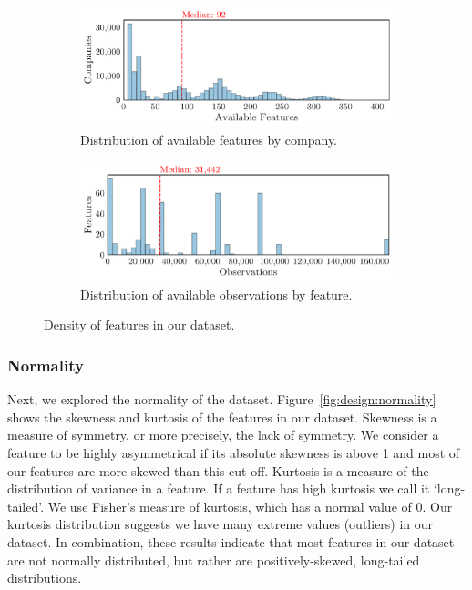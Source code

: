 \documentclass[../thesis/thesis.tex]{subfiles}
\begin{document}
\begin{figure}[!htb]
    \centering
    \begin{subfigure}{\textwidth}
        \includegraphics[width=\textwidth]{../figures/design/sparsity_features}
        \caption[Sparsity by company]{Distribution of available features by company.}
        \label{fig:design:sparsity:features}
    \end{subfigure}
    \begin{subfigure}{\textwidth}
        \includegraphics[width=\textwidth]{../figures/design/sparsity_observations}
        \caption[Sparsity by feature]{Distribution of available observations by feature.}
        \label{fig:design:sparsity:observations}
    \end{subfigure}
    \caption[Distribution of sparsity]{Density of features in our dataset.}
    \label{fig:design:sparsity}
\end{figure}

\subsubsection{Normality}

Next, we explored the normality of the dataset. Figure~\ref{fig:design:normality} shows the skewness and kurtosis of the features in our dataset. Skewness is a measure of symmetry, or more precisely, the lack of symmetry. We consider a feature to be highly asymmetrical if its absolute skewness is above 1 and most of our features are more skewed than this cut-off. Kurtosis is a measure of the distribution of variance in a feature. If a feature has high kurtosis we call it `long-tailed'. We use Fisher's measure of kurtosis, which has a normal value of 0. Our kurtosis distribution suggests we have many extreme values (outliers) in our dataset. In combination, these results indicate that most features in our dataset are not normally distributed, but rather are positively-skewed, long-tailed distributions.
\end{document}
